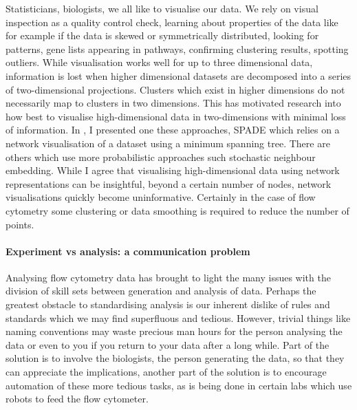 Statisticians, biologists, we all like to visualise our data.
We rely on visual inspection as a quality control check, learning about properties of the data like for example if the data
is skewed or symmetrically distributed, looking for patterns, gene lists appearing in pathways, confirming clustering results, spotting outliers.
While visualisation works well for up to three dimensional data, information is lost when higher dimensional datasets are decomposed into a series of two-dimensional projections.
Clusters which exist in higher dimensions do not necessarily map to clusters in two dimensions.
This has motivated research into how best to visualise high-dimensional data in two-dimensions with minimal loss of information\citep{Amir:2013jp}.
In , I presented one these approaches, \gls{SPADE} which relies on a network visualisation of a dataset using a minimum spanning tree.
There are others which use more probabilistic approaches such stochastic neighbour embedding.
While I agree that visualising high-dimensional data using network representations can be insightful, beyond a certain number of nodes, network visualisations quickly become uninformative.
Certainly in the case of flow cytometry some clustering or data smoothing is required to reduce the number of points.  



\paragraph{Experiment vs analysis: a communication problem}

Analysing flow cytometry data has brought to light the many issues with the division of skill sets between generation and analysis of data.
Perhaps the greatest obstacle to standardising analysis is our inherent dislike of rules and standards which we may find superfluous and tedious.
However, trivial things like naming conventions may waste precious man hours for the person analysing the data or even to you if you return to your data after a long while.
Part of the solution is to involve the biologists, the person generating the data, so that they can appreciate the implications, another part of the solution is to encourage automation of these more tedious tasks, as is being done in certain labs which use robots to feed the flow cytometer.

